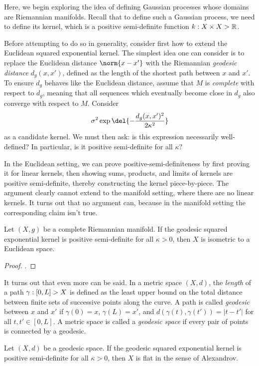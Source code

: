\documentclass[11pt]{book}
\begin{document}
Here, we begin exploring the idea of defining Gaussian processes whose domains are Riemannian manifolds.
Recall that to define such a Gaussian process, we need to define its kernel, which is a positive semi-definite function $k : X \times X \-> \mathbb{R}$.

Before attempting to do so in generality, consider first how to extend the Euclidean squared exponential kernel.
The simplest idea one can consider is to replace the Euclidean distance $\norm{x-x'}$ with the Riemannian \emph{geodesic distance} $d_g(x,x')$, defined as the length of the shortest path between $x$ and $x'$.
To ensure $d_g$ behaves like the Euclidean distance, assume that $M$ is \emph{complete} with respect to $d_g$, meaning that all sequences which eventually become close in $d_g$ also converge with respect to $M$.
Consider
\[
\sigma^2 \exp\del{-\frac{d_g(x,x')^2}{2\kappa^2}}
\]
as a candidate kernel.
We must then ask: is this expression necessarily well-defined? 
In particular, is it positive semi-definite for all $\kappa$?

In the Euclidean setting, we can prove positive-semi-definiteness by first proving it for linear kernels, then showing sums, products, and limits of kernels are positive semi-definite, thereby constructing the kernel piece-by-piece.
The argument clearly cannot extend to the manifold setting, where there are no linear kernels.
It turns out that no argument can, because in the manifold setting the corresponding claim isn't true.

\begin{result}
Let $(X,g)$ be a complete Riemannian manifold.
If the geodesic squared exponential kernel is positive semi-definite for all $\kappa > 0$, then $X$ is isometric to a Euclidean space.
\end{result}

\begin{proof}
\textcite[Theorem 2]{feragen15}.
\end{proof}

It turns out that even more can be said.
In a metric space $(X,d)$, the \emph{length} of a path  $\gamma : [0,L] \-> X$ is defined as the least upper bound on the total distance between finite sets of successive points along the curve.
A path is called \emph{geodesic} between $x$ and $x'$ if $\gamma(0) = x$, $\gamma(L) = x'$, and $d(\gamma(t),\gamma(t')) = |t - t'|$ for all $t,t'\in[0,L]$.
A metric space is called a \emph{geodesic space} if every pair of points is connected by a geodesic.

\begin{result}
Let $(X,d)$ be a geodesic space.
If the geodesic squared exponential kernel is positive semi-definite for all $\kappa > 0$, then $X$ is flat in the sense of Alexandrov.
\end{result}
\end{document}
